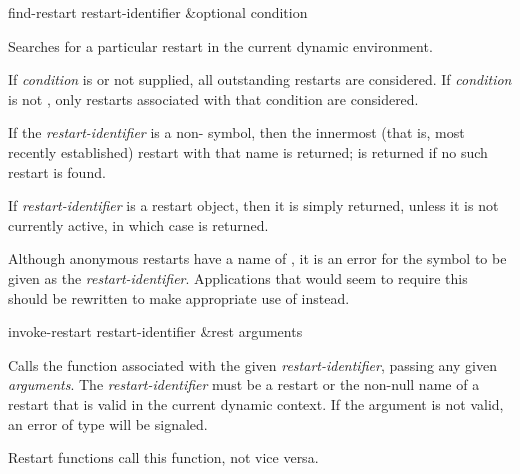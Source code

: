 \begin{defun}[Function]
find-restart restart-identifier &optional condition

  Searches for a particular restart in the current dynamic environment.

If \emph{condition} is  or not supplied, all outstanding restarts
are considered.
If \emph{condition} is not , only restarts associated
with that condition are considered.

  If the \emph{restart-identifier} is a non-
  symbol, then the innermost (that is, most recently
  established) restart with that name is returned;   is returned if no
  such restart is found.

  If \emph{restart-identifier} is a restart object, then it is simply returned,
  unless it is not currently active, in which case  is returned.

  Although anonymous restarts have a name of , it is an error for
  the symbol  to be given as the \emph{restart-identifier}.  Applications that 
  would seem to require this should be rewritten to make appropriate use 
  of  instead.
\end{defun}

\begin{defun}[Function]
invoke-restart restart-identifier &rest arguments

  Calls the function associated with the given \emph{restart-identifier}, passing any given
  \emph{arguments}. The \emph{restart-identifier} must be a restart or the non-null name of a
  restart that is valid in the current dynamic context. If the argument
  is not valid, an error of type  will be signaled.

  \beforenoterule
  \begin{implementation}
  Restart functions call this function, not vice versa.
  \end{implementation}
  \afternoterule
\end{defun}

